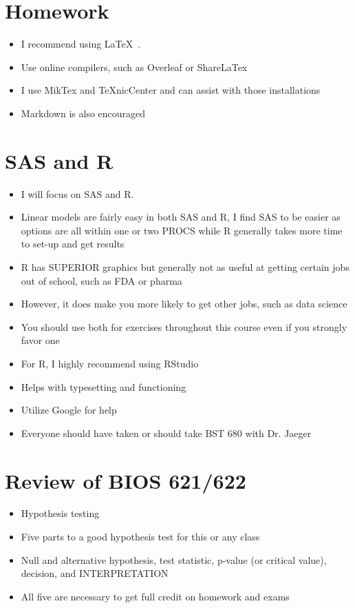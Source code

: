 \documentclass[handout,x11names,unknownkeysallowed]{beamer}
\makeatletter
\newcommand{\beamitem}{\begin{itemize}[<+-|alert@+>]}
\makeatother
\begin{document}
\section{Homework}
\begin{frame}
\beamitem
\item I recommend using \LaTeX\ .
\item Use online compilers, such as Overleaf or ShareLaTex
\item I use MikTex and TeXnicCenter and can assist with those installations
\item Markdown is also encouraged
\end{itemize}
\end{frame}

\section{SAS and R}
\begin{frame}
\beamitem
\item I will focus on SAS and R.  
\item Linear models are fairly easy in both SAS and R, I find SAS to be easier as options are all within one or two PROCS while R generally takes more time to set-up and get results
\item R has SUPERIOR graphics but generally not as useful at getting certain jobs out of school, such as FDA or pharma
\item However, it does make you more likely to get other jobs, such as data science
\item You should use both for exercises throughout this course even if you strongly favor one
\end{itemize}
\end{frame}

\begin{frame}
\beamitem
\item For R, I highly recommend using RStudio
\item Helps with typesetting and functioning
\item Utilize Google for help
\item Everyone should have taken or should take BST 680 with Dr. Jaeger
\end{itemize}
\end{frame}

\section{Review of BIOS 621/622}
\begin{frame}
\beamitem
\item Hypothesis testing
\item Five parts to a good hypothesis test for this or any class 
\item Null and alternative hypothesis, test statistic, p-value (or critical value), decision, and INTERPRETATION
\item All five are necessary to get full credit on homework and exams
\end{itemize}

\end{frame}
\end{document}
